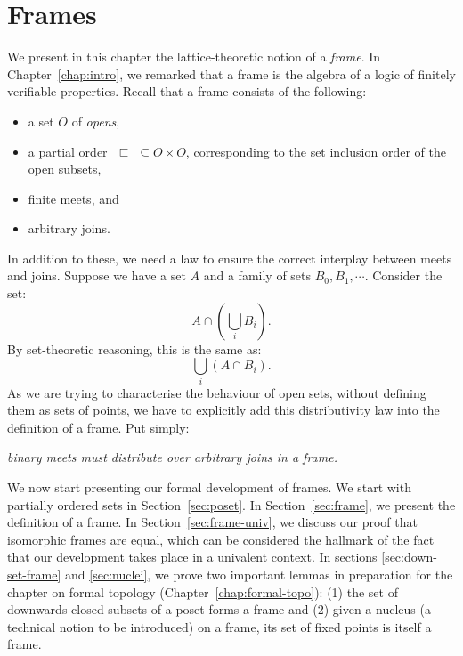 \chapter{Frames}\label{chap:frames}

We present in this chapter the lattice-theoretic notion of a \emph{frame}. In
Chapter~\ref{chap:intro}, we remarked that a frame is the algebra of a logic of finitely
verifiable properties. Recall that a frame consists of the following:
\begin{itemize}
  \item a set $O$ of \emph{opens},
  \item a partial order $\_\sqsubseteq\_ \subseteq O \times O$, corresponding to the set inclusion order of the
    open subsets,
  \item finite meets, and
  \item arbitrary joins.
\end{itemize}

In addition to these, we need a law to ensure the correct interplay between meets and
joins. Suppose we have a set $A$ and a family of sets $B_0, B_1, \cdots$. Consider the set:
\begin{equation*}
  A \cap (\bigcup_i B_i).
\end{equation*}
By set-theoretic reasoning, this is the same as:
\begin{equation*}
  \bigcup_i (A \cap B_i).
\end{equation*}
As we are trying to characterise the behaviour of open sets, without defining them as sets
of points, we have to explicitly add this distributivity law into the definition of a
frame. Put simply:
\begin{center}
  \emph{binary meets must distribute over arbitrary joins in a frame.}
\end{center}

We now start presenting our formal development of frames. We start with partially ordered
sets in Section~\ref{sec:poset}. In Section~\ref{sec:frame}, we present the definition of
a frame. In Section~\ref{sec:frame-univ}, we discuss our proof that isomorphic frames are
equal, which can be considered the hallmark of the fact that our development takes place
in a univalent context. In sections \ref{sec:down-set-frame} and \ref{sec:nuclei}, we
prove two important lemmas in preparation for the chapter on formal topology
(Chapter~\ref{chap:formal-topo}): (1) the set of downwards-closed subsets of a poset forms
a frame and (2) given a nucleus (a technical notion to be introduced) on a frame, its set
of fixed points is itself a frame.

